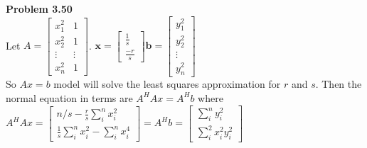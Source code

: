 \documentclass[letterpaper,12pt]{article}
\theoremstyle{definition}
\begin{document}
 \vspace{5mm}
 
 \noindent\textbf{Problem 3.50}\\
 Let $A = \begin{bmatrix} x_1^2 & 1 \\ 
 x_2^2 & 1 \\ 
 \vdots  & \vdots 
 \\ x_n^2 & 1 
 \end{bmatrix}$. $\mathbf{x} = \begin{bmatrix} \frac{1}{s} \\ \frac{-r}{s} \end{bmatrix} \mathbf{b} = \begin{bmatrix} y_1^2 \\ y_2^2 \\ \vdots \\ y_n^2 \end{bmatrix}$\\
 So $Ax = b$ model will solve the least squares approximation for $r$ and $s$.  Then the normal equation in terms are $A^HAx = A^Hb$ where $A^HAx = \begin{bmatrix} n/s - \frac{r}{s}\sum_i^n x_i^2 \\  \frac{1}{s}\sum_i^n x_i^2 -\sum_i^n x_i^4 \end{bmatrix} = A^Hb = \begin{bmatrix} \sum_i^n y_i^2 \\ \sum_i^2 x_i^2y_i^2 \end{bmatrix}$
 
 
\end{document}
